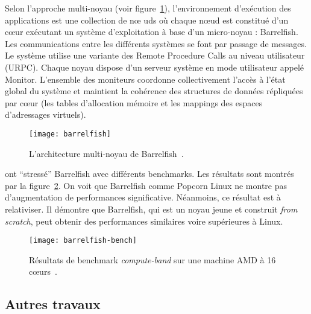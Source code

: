       Selon l’approche multi-noyau (voir figure~\ref{fig:barrelfish}),
      l'environnement d’exécution des applications est une collection de n\oe
      uds où chaque n\oe ud est constitué d’un c\oe ur exécutant un système
      d'exploitation à base d’un micro-noyau : Barrelfish. Les communications
      entre les différents systèmes se font par passage de messages. Le système
      utilise une variante des Remote Procedure Calls au niveau utilisateur
      (URPC). Chaque noyau dispose d’un serveur système en mode utilisateur
      appelé Monitor. L’ensemble des moniteurs coordonne collectivement l’accès
      à l’état global du système et maintient la cohérence des structures de
      données répliquées par c\oe ur (les tables d’allocation mémoire et les
      mappings des espaces d’adressages virtuels).\\

      \begin{figure}[ht]
        \centering \texttt{[image: barrelfish]}
        \caption{L'architecture multi-noyau de
          Barrelfish~\citep{baumann2009multikernel}.}
        \label{fig:barrelfish}
      \end{figure}

      \citeauthor{baumann2009multikernel} ont ``stressé'' Barrelfish avec
      différents benchmarks. Les résultats sont montrés par la
      figure~\ref{fig:barrelfish-bench}. On voit que Barrelfish comme Popcorn
      Linux ne montre pas d'augmentation de performances
      significative. Néanmoins, ce résultat est à relativiser. Il démontre que
      Barrelfish, qui est un noyau jeune et construit \textit{from scratch},
      peut obtenir des performances similaires voire supérieures à Linux.

      \begin{figure}[ht]
        \centering
        \texttt{[image: barrelfish-bench]}
        \caption{Résultats de benchmark \textit{compute-band} sur une machine
          AMD à 16 c\oe urs~\citep{baumann2009multikernel}.}
        \label{fig:barrelfish-bench}
      \end{figure}

    \subsection{Autres travaux}
    \label{subsec:others}
    
